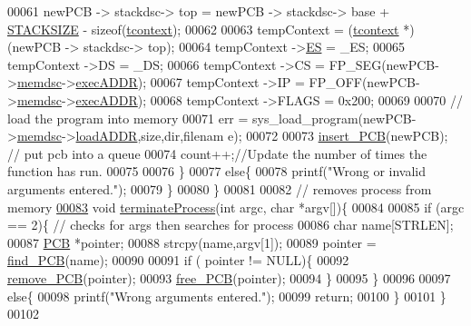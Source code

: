 \begin{DoxyCode}
00061                 newPCB -> stackdsc-> top = newPCB -> stackdsc-> base + \hyperlink{mpx__r2_8h_a21d9543c516fffee84a7963224271f95}{STACKSIZE} 
      - \textcolor{keyword}{sizeof}(\hyperlink{structcontext}{tcontext});
00062                 
00063                 tempContext = (\hyperlink{structcontext}{tcontext} *) (newPCB -> stackdsc-> top);
00064                 tempContext ->\hyperlink{structcontext_a81a78fef7bda3a5dd852b28a905890ab}{ES} = \_ES;
00065                 tempContext ->DS = \_DS;
00066                 tempContext ->CS = FP\_SEG(newPCB->\hyperlink{structprocess_a163551ab7b60184b48e5d440fcd5c2b8}{memdsc}->\hyperlink{structmem_a5340491e17307817e6dca3b1d260d18a}{execADDR});
00067                 tempContext ->IP = FP\_OFF(newPCB->\hyperlink{structprocess_a163551ab7b60184b48e5d440fcd5c2b8}{memdsc}->\hyperlink{structmem_a5340491e17307817e6dca3b1d260d18a}{execADDR});
00068                 tempContext ->FLAGS = 0x200;
00069                 
00070                 \textcolor{comment}{// load the program into memory}
00071                  err = sys\_load\_program(newPCB->\hyperlink{structprocess_a163551ab7b60184b48e5d440fcd5c2b8}{memdsc}->\hyperlink{structmem_a8f5a4db03ee0560e6bd4dd602ad753c0}{loadADDR},size,dir,filenam
      e);
00072                 
00073                 \hyperlink{mpx__r2_8c_aa3b334e3a5afd6e590917667ad359a6f}{insert_PCB}(newPCB);     \textcolor{comment}{// put pcb into a queue}
00074                 count++;\textcolor{comment}{//Update the number of times the function has run.}
00075                 
00076         \}
00077         \textcolor{keywordflow}{else}\{
00078                 printf(\textcolor{stringliteral}{"Wrong or invalid arguments entered."});
00079         \}
00080 \}
00081 
00082 \textcolor{comment}{// removes process from memory}
\hypertarget{mpx__r4_8c_8_l_o_c_a_l_8c_source_l00083}{}\hyperlink{mpx__r4_8c_8_l_o_c_a_l_8c_aaa714b85ce262f949d018430daf6da00}{00083} \textcolor{keywordtype}{void} \hyperlink{mpx__r4_8c_aaa714b85ce262f949d018430daf6da00}{terminateProcess}(\textcolor{keywordtype}{int} argc, \textcolor{keywordtype}{char} *argv[])\{
00084 
00085         \textcolor{keywordflow}{if} (argc == 2)\{ \textcolor{comment}{// checks for args then searches for process}
00086                 \textcolor{keywordtype}{char} name[STRLEN];
00087                 \hyperlink{structprocess}{PCB} *pointer;
00088                 strcpy(name,argv[1]);
00089                 pointer = \hyperlink{mpx__r2_8c_a612a6abcb66c688a32f33abc93ff3990}{find_PCB}(name);
00090         
00091                 \textcolor{keywordflow}{if} ( pointer != NULL)\{
00092                         \hyperlink{mpx__r2_8c_af30a3658210d449b4b53e5be2ed2bc2e}{remove_PCB}(pointer);
00093                         \hyperlink{mpx__r2_8c_a79890f055b1d0fccf1962bbde4877caa}{free_PCB}(pointer);
00094                 \}
00095         \}
00096         
00097         \textcolor{keywordflow}{else}\{
00098                 printf(\textcolor{stringliteral}{"Wrong arguments entered."});
00099                 \textcolor{keywordflow}{return};
00100         \}
00101 \}
00102 
\end{DoxyCode}
